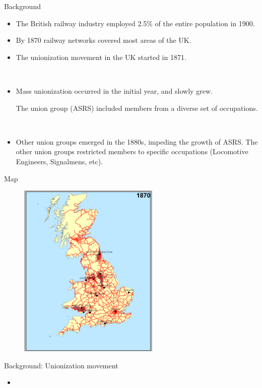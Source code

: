 \begin{frame}{Background}
\begin{itemize}
    \item The British railway industry employed 2.5\% of the entire population in 1900.

    \item By 1870 railway networks covered most areas of the UK.
    
    \item The unionization movement in the UK started in 1871.

    \

    \item Mass unionization occurred in the initial year, and slowly grew.
    
    The union group (ASRS) included members from a diverse set of occupations.

    \

    \item Other union groups emerged in the 1880s, impeding the growth of ASRS.
    The other union groups restricted members to specific occupations (Locomotive Engineers, Signalmens, etc).
\end{itemize}
    
\end{frame}

\begin{frame}{Map}
    \begin{figure}
        \centering
        \includegraphics[width = 0.6\textwidth]{Background/Map.png}
        \label{fig:enter-label}
    \end{figure}
\end{frame}

\begin{frame}{Background: Unionization movement}
    \begin{itemize}
        \item 
    \end{itemize}
\end{frame}